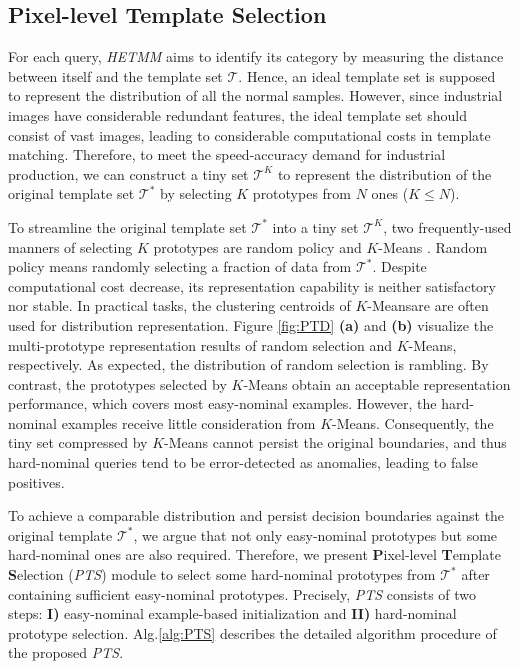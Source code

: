 \documentclass[default,iicol]{sn-jnl}\usepackage[algo2e,ruled,linesnumbered]{algorithm2e}
\theoremstyle{thmstyleone}\newtheorem{theorem}{Theorem}\newtheorem{proposition}[theorem]{Proposition}
\theoremstyle{thmstyletwo}\newtheorem{example}{Example}\newtheorem{remark}{Remark}
\theoremstyle{thmstylethree}\newtheorem{definition}{Definition}
\begin{document}
\subsection{Pixel-level Template Selection}
For each query, \textit{HETMM} aims to identify its category by measuring the distance between itself and the template set $\mathcal{T}$.
Hence, an ideal template set is supposed to represent the distribution of all the normal samples.
However, since industrial images have considerable redundant features, the ideal template set should consist of vast images, leading to considerable computational costs in template matching.
Therefore, to meet the speed-accuracy demand for industrial production, we can construct a tiny set $\mathcal{T}^{K}$ to represent the distribution of the original template set $\mathcal{T^{*}}$ by selecting $K$ prototypes from $N$ ones ($K\le N$).

To streamline the original template set $\mathcal{T^{*}}$ into a tiny set $\mathcal{T}^{K}$, two frequently-used manners of selecting $K$ prototypes are random policy and $K$-Means \cite{kmeans}.
Random policy means randomly selecting a fraction of data from $\mathcal{T^{*}}$.
Despite computational cost decrease, its representation capability is neither satisfactory nor stable.
In practical tasks, the clustering centroids of $K$-Meansare are often used for distribution representation.
Figure \ref{fig:PTD} \textbf{(a)} and \textbf{(b)} visualize the multi-prototype representation results of random selection and $K$-Means, respectively.
As expected, the distribution of random selection is rambling.
By contrast, the prototypes selected by $K$-Means obtain an acceptable representation performance, which covers most easy-nominal examples.
However, the hard-nominal examples receive little consideration from $K$-Means.
Consequently, the tiny set compressed by $K$-Means cannot persist the original boundaries, and thus hard-nominal queries tend to be error-detected as anomalies, leading to false positives.

To achieve a comparable distribution and persist decision boundaries against the original template $\mathcal{T}^{*}$, we argue that not only easy-nominal prototypes but some hard-nominal ones are also required.
Therefore, we present \textbf{P}ixel-level \textbf{T}emplate \textbf{S}election (\textit{PTS}) module to select some hard-nominal prototypes from $\mathcal{T}^{*}$ after containing sufficient easy-nominal prototypes.
Precisely, \textit{PTS} consists of two steps: \textbf{I)} easy-nominal example-based initialization and \textbf{II)} hard-nominal prototype selection.
Alg.\ref{alg:PTS} describes the detailed algorithm procedure of the proposed \textit{PTS}.
\end{document}
